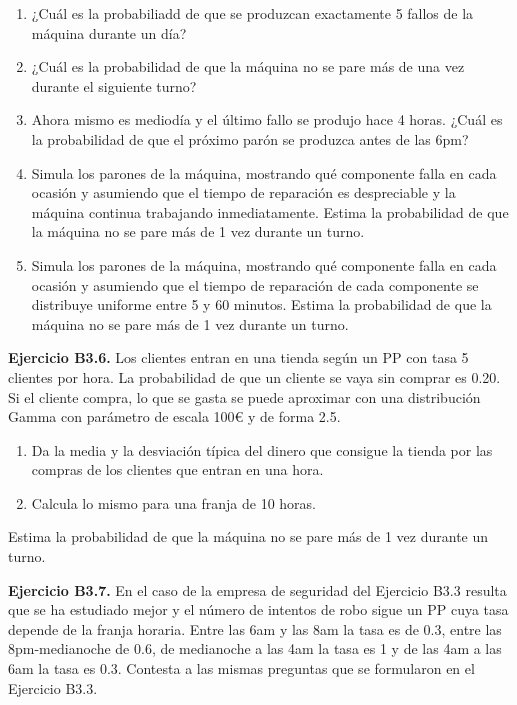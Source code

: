 \documentclass[
]{book}
\providecommand{\tightlist}{%
  \setlength{\itemsep}{0pt}\setlength{\parskip}{0pt}}
\theoremstyle{definition}
\theoremstyle{definition}
\theoremstyle{definition}
\theoremstyle{definition}
\theoremstyle{remark}
\begin{document}
\begin{enumerate}
\def\labelenumi{\arabic{enumi}.}
\tightlist
\item
  ¿Cuál es la probabiliadd de que se produzcan exactamente 5 fallos de la máquina durante un día?
\item
  ¿Cuál es la probabilidad de que la máquina no se pare más de una vez durante el siguiente turno?
\item
  Ahora mismo es mediodía y el último fallo se produjo hace 4 horas. ¿Cuál es la probabilidad de que el próximo parón se produzca antes de las 6pm?
\item
  Simula los parones de la máquina, mostrando qué componente falla en cada ocasión y asumiendo que el tiempo de reparación es despreciable y la máquina continua trabajando inmediatamente. Estima la probabilidad de que la máquina no se pare más de 1 vez durante un turno.
\item
  Simula los parones de la máquina, mostrando qué componente falla en cada ocasión y asumiendo que el tiempo de reparación de cada componente se distribuye uniforme entre 5 y 60 minutos. Estima la probabilidad de que la máquina no se pare más de 1 vez durante un turno.
\end{enumerate}

\textbf{Ejercicio B3.6.} Los clientes entran en una tienda según un PP con tasa 5 clientes por hora. La probabilidad de que un cliente se vaya sin comprar es 0.20. Si el cliente compra, lo que se gasta se puede aproximar con una distribución Gamma con parámetro de escala 100€ y de forma 2.5.

\begin{enumerate}
\def\labelenumi{\arabic{enumi}.}
\tightlist
\item
  Da la media y la desviación típica del dinero que consigue la tienda por las compras de los clientes que entran en una hora.
\item
  Calcula lo mismo para una franja de 10 horas.
\end{enumerate}

Estima la probabilidad de que la máquina no se pare más de 1 vez durante un turno.

\textbf{Ejercicio B3.7.} En el caso de la empresa de seguridad del Ejercicio B3.3 resulta que se ha estudiado mejor y el número de intentos de robo sigue un PP cuya tasa depende de la franja horaria. Entre las 6am y las 8am la tasa es de 0.3, entre las 8pm-medianoche de 0.6, de medianoche a las 4am la tasa es 1 y de las 4am a las 6am la tasa es 0.3. Contesta a las mismas preguntas que se formularon en el Ejercicio B3.3.
\end{document}
